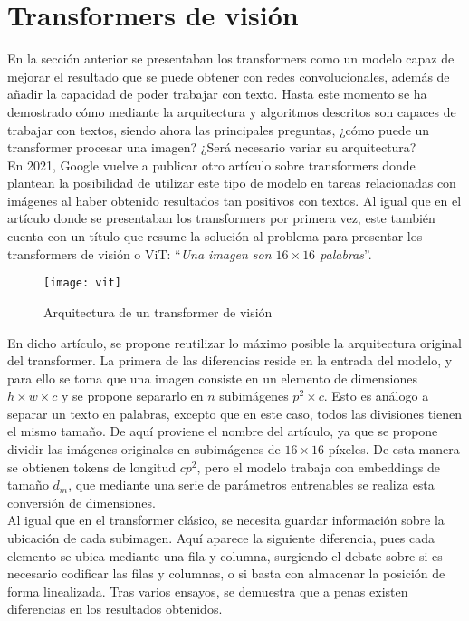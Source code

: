 		\section{Transformers de visión}
		
			En la sección anterior se presentaban los transformers como un modelo capaz de mejorar el resultado que se puede obtener con redes convolucionales, además de añadir la capacidad de poder trabajar con texto. Hasta este momento se ha demostrado cómo mediante la arquitectura y algoritmos descritos son capaces de trabajar con textos, siendo ahora las principales preguntas, ¿cómo puede un transformer procesar una imagen? ¿Será necesario variar su arquitectura?\\
			
			En 2021, Google vuelve a publicar otro artículo \cite{vit} sobre transformers donde plantean la posibilidad de utilizar este tipo de modelo en tareas relacionadas con imágenes al haber obtenido resultados tan positivos con textos. Al igual que en el artículo donde se presentaban los transformers por primera vez, este también cuenta con un título que resume la solución al problema para presentar los transformers de visión o ViT: ``\textit{Una imagen son $16 \times 16$ palabras}''. \\
			
			\begin{figure}[!h]
				\centering
				\texttt{[image: vit]}
				\caption{Arquitectura de un transformer de visión}
				\label{fig:vit_arq}
			\end{figure}
			
			En dicho artículo, se propone reutilizar lo máximo posible la arquitectura original del transformer. La primera de las diferencias reside en la entrada del modelo, y para ello se toma que una imagen consiste en un elemento de dimensiones ${h \times w \times c}$ y se propone separarlo en $n$ subimágenes $p^2 \times c$. Esto es análogo a separar un texto en palabras, excepto que en este caso, todos las divisiones tienen el mismo tamaño. De aquí proviene el nombre del artículo, ya que se propone dividir las imágenes originales en subimágenes de $16 \times 16$ píxeles. De esta manera se obtienen tokens de longitud $cp^2$, pero el modelo trabaja con embeddings de tamaño $d_m$, que mediante una serie de parámetros entrenables se realiza esta conversión de dimensiones. \\
			
			Al igual que en el transformer clásico, se necesita guardar información sobre la ubicación de cada subimagen. Aquí aparece la siguiente diferencia, pues cada elemento se ubica mediante una fila y columna, surgiendo el debate sobre si es necesario codificar las filas y columnas, o si basta con almacenar la posición de forma linealizada. Tras varios ensayos, se demuestra que a penas existen diferencias en los resultados obtenidos. \\
			
